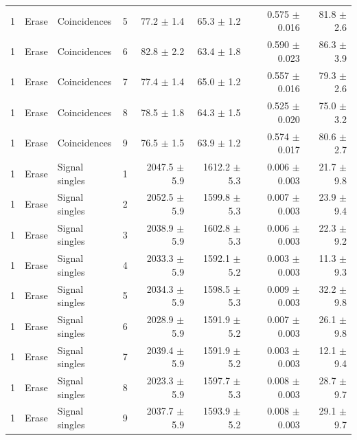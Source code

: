\begin{tabular}{llllrrrr}
1 & Erase & Coincidences & 5 & 77.2 \ensuremath{\pm} 1.4 & 65.3 \ensuremath{\pm} 1.2 & 0.575 \ensuremath{\pm} 0.016 & 81.8 \ensuremath{\pm} 2.6 \\
1 & Erase & Coincidences & 6 & 82.8 \ensuremath{\pm} 2.2 & 63.4 \ensuremath{\pm} 1.8 & 0.590 \ensuremath{\pm} 0.023 & 86.3 \ensuremath{\pm} 3.9 \\
1 & Erase & Coincidences & 7 & 77.4 \ensuremath{\pm} 1.4 & 65.0 \ensuremath{\pm} 1.2 & 0.557 \ensuremath{\pm} 0.016 & 79.3 \ensuremath{\pm} 2.6 \\
1 & Erase & Coincidences & 8 & 78.5 \ensuremath{\pm} 1.8 & 64.3 \ensuremath{\pm} 1.5 & 0.525 \ensuremath{\pm} 0.020 & 75.0 \ensuremath{\pm} 3.2 \\
1 & Erase & Coincidences & 9 & 76.5 \ensuremath{\pm} 1.5 & 63.9 \ensuremath{\pm} 1.2 & 0.574 \ensuremath{\pm} 0.017 & 80.6 \ensuremath{\pm} 2.7 \\
\midrule
1 & Erase & Signal singles & 1 & 2047.5 \ensuremath{\pm} 5.9 & 1612.2 \ensuremath{\pm} 5.3 & 0.006 \ensuremath{\pm} 0.003 & 21.7 \ensuremath{\pm} 9.8 \\
1 & Erase & Signal singles & 2 & 2052.5 \ensuremath{\pm} 5.9 & 1599.8 \ensuremath{\pm} 5.3 & 0.007 \ensuremath{\pm} 0.003 & 23.9 \ensuremath{\pm} 9.4 \\
1 & Erase & Signal singles & 3 & 2038.9 \ensuremath{\pm} 5.9 & 1602.8 \ensuremath{\pm} 5.3 & 0.006 \ensuremath{\pm} 0.003 & 22.3 \ensuremath{\pm} 9.2 \\
1 & Erase & Signal singles & 4 & 2033.3 \ensuremath{\pm} 5.9 & 1592.1 \ensuremath{\pm} 5.2 & 0.003 \ensuremath{\pm} 0.003 & 11.3 \ensuremath{\pm} 9.3 \\
1 & Erase & Signal singles & 5 & 2034.3 \ensuremath{\pm} 5.9 & 1598.5 \ensuremath{\pm} 5.3 & 0.009 \ensuremath{\pm} 0.003 & 32.2 \ensuremath{\pm} 9.8 \\
1 & Erase & Signal singles & 6 & 2028.9 \ensuremath{\pm} 5.9 & 1591.9 \ensuremath{\pm} 5.2 & 0.007 \ensuremath{\pm} 0.003 & 26.1 \ensuremath{\pm} 9.8 \\
1 & Erase & Signal singles & 7 & 2039.4 \ensuremath{\pm} 5.9 & 1591.9 \ensuremath{\pm} 5.2 & 0.003 \ensuremath{\pm} 0.003 & 12.1 \ensuremath{\pm} 9.4 \\
1 & Erase & Signal singles & 8 & 2023.3 \ensuremath{\pm} 5.9 & 1597.7 \ensuremath{\pm} 5.3 & 0.008 \ensuremath{\pm} 0.003 & 28.7 \ensuremath{\pm} 9.7 \\
1 & Erase & Signal singles & 9 & 2037.7 \ensuremath{\pm} 5.9 & 1593.9 \ensuremath{\pm} 5.2 & 0.008 \ensuremath{\pm} 0.003 & 29.1 \ensuremath{\pm} 9.7 \\
\bottomrule
\end{tabular}
